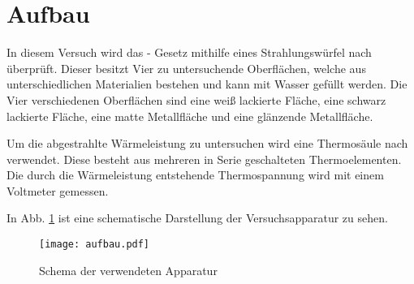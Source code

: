 
\section{Aufbau}
In diesem Versuch wird das - Gesetz mithilfe eines Strahlungswürfel nach  überprüft. Dieser besitzt Vier zu untersuchende Oberflächen, welche aus unterschiedlichen Materialien bestehen und kann mit Wasser gefüllt werden. Die Vier verschiedenen Oberflächen sind eine weiß lackierte Fläche, eine schwarz lackierte Fläche, eine matte Metallfläche und eine glänzende Metallfläche.

Um die abgestrahlte Wärmeleistung zu untersuchen wird eine Thermosäule nach  verwendet.
Diese besteht aus mehreren in Serie geschalteten Thermoelementen. Die durch die Wärmeleistung entstehende Thermospannung wird mit einem Voltmeter gemessen.

In Abb. \ref{fig:aufbau} ist eine schematische Darstellung der Versuchsapparatur zu sehen.
%
\begin{figure}
  \centering
  \texttt{[image: aufbau.pdf]}
  \caption{Schema der verwendeten Apparatur}
  \label{fig:aufbau}
\end{figure}
%
